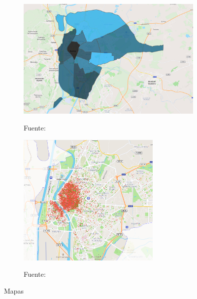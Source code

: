 \documentclass[a4paper,10pt]{article}
\begin{document}
            \begin{figure}[ht]
                \begin{subfigure}{0.5\textwidth}
                    \includegraphics*[width = 10cm]{graphics/sevilledensity_map.jpeg}
                    \begin{flushleft}
                        \footnotesize{Fuente:}
                    \end{flushleft}
                \end{subfigure}
                \begin{subfigure}{0.5\textwidth}
                    \includegraphics[width = 7.95 cm, height = 6.46cm]{graphics/cap_sevilledensity_distribution_map.png}
                    \begin{flushleft}
                        \footnotesize{Fuente: }
                    \end{flushleft}
                \end{subfigure}
                \caption{Mapas }
            \end{figure}


\end{document}
